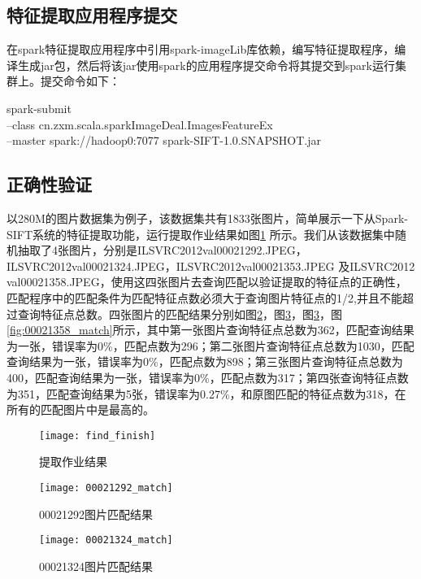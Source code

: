\subsection{特征提取应用程序提交}
在spark特征提取应用程序中引用spark-imageLib库依赖，编写特征提取程序，编译生成jar包，然后将该jar使用spark的应用程序提交命令将其提交到spark运行集群上。提交命令如下：
\begin{code}
spark-submit
\\--class cn.zxm.scala.sparkImageDeal.ImagesFeatureEx
\\--master spark://hadoop0:7077
spark-SIFT-1.0.SNAPSHOT.jar
\end{code}
\subsection{正确性验证}
以280M的图片数据集为例子，该数据集共有1833张图片，简单展示一下从Spark-SIFT系统的特征提取功能，运行提取作业结果如图\ref{fig:find_finish} 所示。我们从该数据集中随机抽取了4张图片，分别是ILSVRC2012\textunderscore val\textunderscore00021292.JPEG，ILSVRC2012\textunderscore val\textunderscore00021324.JPEG，ILSVRC2012\textunderscore val\textunderscore00021353.JPEG 及ILSVRC2012\textunderscore\\val\textunderscore00021358.JPEG，使用这四张图片去查询匹配以验证提取的特征点的正确性，匹配程序中的匹配条件为匹配特征点数必须大于查询图片特征点的1/2,并且不能超过查询特征点总数。四张图片的匹配结果分别如图\ref{fig:00021292_match}，图\ref{fig:00021324_match}，图\ref{fig:00021324_match}，图\ref{fig:00021358_match}所示，其中第一张图片查询特征点总数为362，匹配查询结果为一张，错误率为0\%，匹配点数为296；第二张图片查询特征点总数为1030，匹配查询结果为一张，错误率为0\%，匹配点数为898；第三张图片查询特征点总数为400，匹配查询结果为一张，错误率为0\%，匹配点数为317；第四张查询特征点数为351，匹配查询结果为5张，错误率为0.27\%，和原图匹配的特征点数为318，在所有的匹配图片中是最高的。
\begin{figure}[htp]
\centering
\texttt{[image: find\_finish]}
\caption{提取作业结果}
\label{fig:find_finish}
\end{figure}

\begin{figure}[htp]
\centering
\texttt{[image: 00021292\_match]}
\caption{00021292图片匹配结果}
\label{fig:00021292_match}
\end{figure}

\begin{figure}[htp]
\centering
\texttt{[image: 00021324\_match]}
\caption{00021324图片匹配结果}
\label{fig:00021324_match}
\end{figure}

